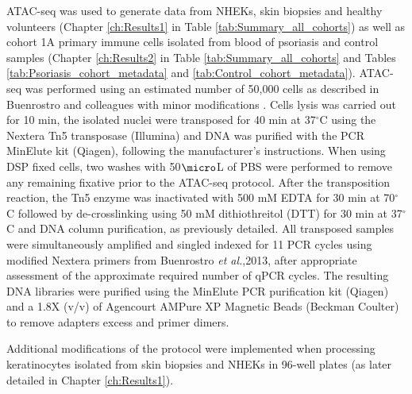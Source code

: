 ATAC-seq was used to generate data from NHEKs, skin biopsies and healthy volunteers (Chapter \ref{ch:Results1} in Table \ref{tab:Summary_all_cohorts}) as well as cohort 1A primary immune cells isolated from blood of psoriasis and control samples (Chapter \ref{ch:Results2} in Table \ref{tab:Summary_all_cohorts} and Tables \ref{tab:Psoriasis_cohort_metadata} and \ref{tab:Control_cohort_metadata}). ATAC-seq was performed using an estimated number of 50,000 cells as described in Buenrostro and colleagues with minor modifications \parencite{Buenrostro2013}. Cells lysis was carried out for 10 min, the isolated nuclei were transposed for 40 min at 37{$^\circ$}C using the Nextera Tn5 transposase (Illumina) and DNA was purified with the PCR MinElute kit (Qiagen), following the manufacturer's instructions. When using DSP fixed cells, two washes with 50$\micro$L of PBS were performed to remove any remaining fixative prior to the ATAC-seq protocol. After the transposition reaction, the Tn5 enzyme was inactivated with 500 mM EDTA for 30 min at 70{$^\circ$}C followed by de-crosslinking using 50 mM dithiothreitol (DTT) for 30 min at 37{$^\circ$}C and DNA column purification, as previously detailed.  All transposed samples were simultaneously amplified and singled indexed for 11 PCR cycles using modified Nextera primers from Buenrostro \textit{et al.},2013, after appropriate assessment of the approximate required number of qPCR cycles. The resulting DNA libraries were purified using the MinElute PCR purification kit (Qiagen) and a 1.8X (v/v) of Agencourt AMPure XP Magnetic Beads (Beckman Coulter) to remove adapters excess and primer dimers.

Additional modifications of the protocol were implemented when processing keratinocytes isolated from skin biopsies and NHEKs in 96-well plates \parencite{Bao2015} (as later detailed in Chapter \ref{ch:Results1}).

